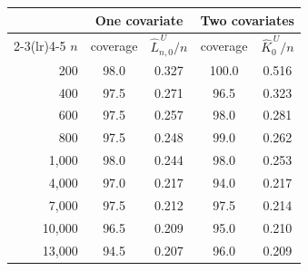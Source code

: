 \begin{tabular}{rcccc}
\toprule
& \multicolumn{2}{c}{One covariate} & \multicolumn{2}{c}{Two covariates} \\
\cmidrule(lr){2-3}\cmidrule(lr){4-5}
$n$ & coverage & $\widehat L_{n,0}^{\,U}/n$ & coverage & $\widehat K_0^{\,U}/n$ \\
\midrule
200 & 98.0 & 0.327 & 100.0 & 0.516 \\
400 & 97.5 & 0.271 & 96.5 & 0.323 \\
600 & 97.5 & 0.257 & 98.0 & 0.281 \\
800 & 97.5 & 0.248 & 99.0 & 0.262 \\
1,000 & 98.0 & 0.244 & 98.0 & 0.253 \\
4,000 & 97.0 & 0.217 & 94.0 & 0.217 \\
7,000 & 97.5 & 0.212 & 97.5 & 0.214 \\
10,000 & 96.5 & 0.209 & 95.0 & 0.210 \\
13,000 & 94.5 & 0.207 & 96.0 & 0.209 \\
\bottomrule
\end{tabular}
